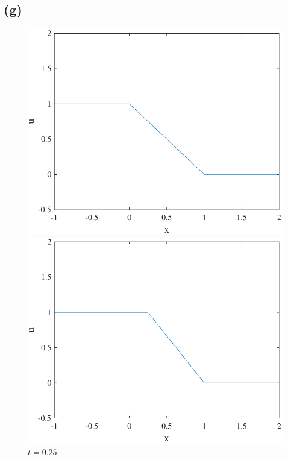 \documentclass{article}
\begin{document}
\subsection*{(g)}
\begin{figure}[H]
  \centering
  \begin{minipage}[b]{0.49\textwidth}
    \includegraphics[width=\textwidth]{hw_14_plot5.pdf}
    \caption{$t = 0$}

  \end{minipage}
  \hfill
  \begin{minipage}[b]{0.49\textwidth}
    \includegraphics[width=\textwidth]{hw_14_plot6.pdf}
    \caption{$t = 0.25$}


\end{minipage}
\end{figure}
\end{document}
